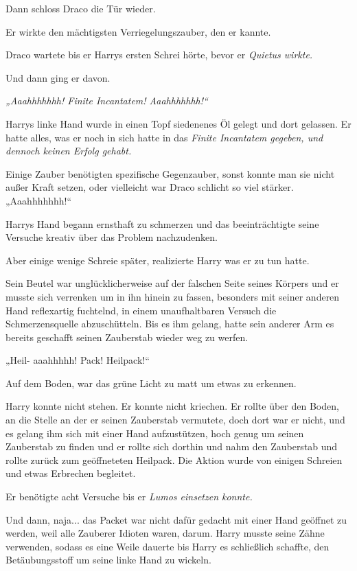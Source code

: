 {Dann schloss Draco die Tür wieder.

Er wirkte den mächtigsten Verriegelungszauber, den er kannte.

Draco wartete bis er Harrys ersten Schrei hörte, bevor er \emph{Quietus wirkte\emph{.}}

Und dann ging er davon.

\emph{„Aaahhhhhhh! Finite Incantatem! Aaahhhhhhh!“}

Harrys linke Hand wurde in einen Topf siedenenes Öl gelegt und dort gelassen. Er hatte alles, was er noch in sich hatte in das \emph{Finite Incantatem gegeben, und dennoch keinen Erfolg gehabt.}

Einige Zauber benötigten spezifische Gegenzauber, sonst konnte man sie nicht außer Kraft setzen, oder vielleicht war Draco schlicht so viel stärker.\\ „Aaahhhhhhh!“

Harrys Hand begann ernsthaft zu schmerzen und das beeinträchtigte seine Versuche kreativ über das Problem nachzudenken.

Aber einige wenige Schreie später, realizierte Harry was er zu tun hatte.

Sein Beutel war unglücklicherweise auf der falschen Seite seines Körpers und er musste sich verrenken um in ihn hinein zu fassen, besonders mit seiner anderen Hand reflexartig fuchtelnd, in einem unaufhaltbaren Versuch die Schmerzensquelle abzuschütteln. Bis es ihm gelang, hatte sein anderer Arm es bereits geschafft seinen Zauberstab wieder weg zu werfen.

„Heil- aaahhhhh! Pack! Heilpack!“

Auf dem Boden, war das grüne Licht zu matt um etwas zu erkennen.

Harry konnte nicht stehen. Er konnte nicht kriechen. Er rollte über den Boden, an die Stelle an der er seinen Zauberstab vermutete, doch dort war er nicht, und es gelang ihm sich mit einer Hand aufzustützen, hoch genug um seinen Zauberstab zu finden und er rollte sich dorthin und nahm den Zauberstab und rollte zurück zum geöffneteten Heilpack. Die Aktion wurde von einigen Schreien und etwas Erbrechen begleitet.

Er benötigte acht Versuche bis er \emph{Lumos einsetzen konnte.}

Und dann, naja... das Packet war nicht dafür gedacht mit einer Hand geöffnet zu werden, weil alle Zauberer Idioten waren, darum. Harry musste seine Zähne verwenden, sodass es eine Weile dauerte bis Harry es schließlich schaffte, den Betäubungsstoff um seine linke Hand zu wickeln.

}
